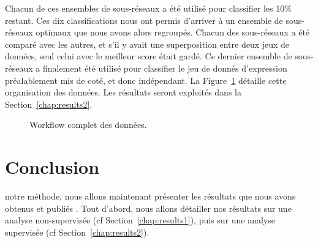 			Chacun de ces ensembles de sous-réseaux a été utilisé pour classifier les 10\% restant.
			Ces dix classifications nous ont permis d'arriver à un ensemble de sous-réseaux optimaux que nous avons alors regroupés.
			Chacun des sous-réseaux a été comparé avec les autres, et s'il y avait une superposition entre deux jeux de données, seul celui avec le meilleur score était gardé.
			Ce dernier ensemble de sous-réseaux a finalement été utilisé pour classifier le jeu de donnés d'expression préalablement mis de coté, et donc indépendant.
			La Figure~\ref{fig:Workflow} détaille cette organisation des données.
			Les résultats seront exploités dans la Section~\ref{chap:results2}.

			\begin{figure}
				\begin{center}
					\def\svgwidth{\columnwidth}
					\caption{Workflow complet des données.}
					\label{fig:Workflow}
				\end{center}
			\end{figure}

\pagebreak

	\section{\textcolor{green!45!black}{Conclusion}}
		 notre méthode, nous allons maintenant présenter les résultats que nous avons obtenus et publiés \citet{Garcia2011,Garcia2012}. Tout d'abord, nous allons détailler nos résultats sur une analyse non-supervisée (cf Section~\ref{chap:results1}), puis sur une analyse supervisée (cf Section~\ref{chap:results2}).
